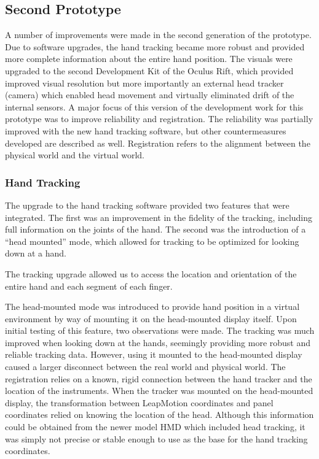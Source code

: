 \subsection{Second Prototype}

A number of improvements were made in the second generation of the prototype.
Due to software upgrades, the hand tracking became more robust and provided more complete information about the entire hand position.
The visuals were upgraded to the second Development Kit of the Oculus Rift, which provided improved visual resolution but more importantly an external head tracker (camera) which enabled head movement and virtually eliminated drift of the internal sensors.
A major focus of this version of the development work for this prototype was to improve reliability and registration.
The reliability was partially improved with the new hand tracking software, but other countermeasures developed are described as well.
Registration refers to the alignment between the physical world and the virtual world.

\subsubsection{Hand Tracking}

The upgrade to the hand tracking software provided two features that were integrated.
The first was an improvement in the fidelity of the tracking, including full information on the joints of the hand.
The second was the introduction of a ``head mounted'' mode, which allowed for tracking to be optimized for looking down at a hand.

The tracking upgrade allowed us to access the location and orientation of the entire hand and each segment of each finger.

The head-mounted mode was introduced to provide hand position in a virtual environment by way of mounting it on the head-mounted display itself.
Upon initial testing of this feature, two observations were made.
The tracking was much improved when looking down at the hands, seemingly providing more robust and reliable tracking data.
However, using it mounted to the head-mounted display caused a larger disconnect between the real world and physical world.
The registration relies on a known, rigid connection between the hand tracker and the location of the instruments.
When the tracker was mounted on the head-mounted display, the transformation between LeapMotion coordinates and panel coordinates relied on knowing the location of the head.
Although this information could be obtained from the newer model HMD which included head tracking, it was simply not precise or stable enough to use as the base for the hand tracking coordinates.

